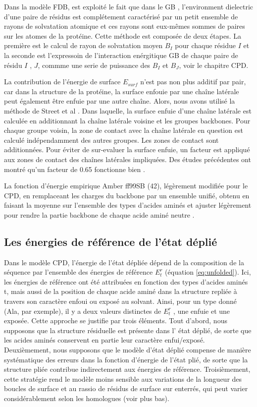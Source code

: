 Dans la modèle FDB, est exploité le fait que dans le GB , l'environment dielectric d'une paire de résidus est complétement caractérisé par un petit ensemble de rayons de solvatation atomique et ces rayons sont eux-mêmes sommes de paires sur les atomes de la protéine. Cette méthode est composée de deux étapes. La première est le calcul de rayon de solvatation moyen $B_I$ pour chaque résidue $I$ et la seconde est l'expressoin de l'interaction enérgitique GB de chaque paire de résidu $I$ , $J$, commme une serie de puissance des  $B_I$  et $B_J$, voir le chapitre CPD. 

La contribution de l'énergie de surface $E_{surf}$ n'est pas non plus additif par pair, car dans la structure de la protéine, la surface enfouie par une chaîne latérale peut également être enfuie par une autre chaîne. Alors, nous avons utilisé la méthode de Street et al \cite{Street98}. Dans laquelle, la surface enfuie d'une chaîne latérale est calculée en additionnant la chaîne latérale voisine et les groupes backbones. Pour chaque groupe voisin, la zone de contact avec la chaîne latérale en question est calculé indépendamment des autres groupes. Les zones de contact sont additionnées. Pour éviter de sur-evaluer la surface enfuie, un facteur est appliqué aux zones de contact des chaînes latérales impliquées. Des études précédentes ont montré qu'un facteur de 0.65 fonctionne bien \cite{Lopes07,Gaillard14}.  

La fonction d'énergie empirique Amber ff99SB (42), légèrement modifiée pour le CPD, en remplaceant les charges du backbone par un ensemble unifié, obtenu en faisant la moyenne sur l'ensemble des types  d'acides aminés et ajuster légèrement pour rendre la partie backbone de chaque acide aminé neutre \cite{Aleksandrov10b}.

\subsection{Les énergies de référence de l'état déplié}

Dans le modèle CPD, l'énergie de l'état dépliée dépend de la composition de la séquence par l'ensemble des énergies de référence $E^r_t$ (équation \ref{eq:unfolded}). Ici, les énergies de référence ont été attribuées en fonction des types d'acides aminés t, mais aussi de la position de chaque acide aminé dans la structure repliée à travers son caractère enfoui ou exposé au solvant. Ainsi, pour un type donné (Ala, par exemple), il y a deux valeurs distinctes de $E^r_t$ , une enfuie et une exposée. Cette approche se justifie par trois éléments. Tout d'abord, nous supposons que la structure résiduelle est présente dans l' état déplié, de sorte que les acides aminés conservent en partie leur caractère enfui/exposé. Deuxièmement, nous supposons que le modèle d'état déplié compense de manière systématique des erreurs dans la fonction d'énergie de l'état plié, de sorte que  la structure pliée contribue indirectement aux énergies de référence. Troisièmement, cette stratégie rend le modèle moins sensible aux variations de la longueur des boucles de surface et au rassio  de résidus de surface sur  enterrés, qui peut varier considérablement selon les homologues (voir plus bas).  

